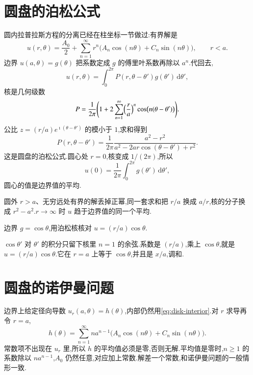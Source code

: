\section{圆盘的泊松公式}
圆内拉普拉斯方程的分离已经在柱坐标一节做过:有界解是
\begin{equation}
  u(r,\theta)=\frac{A_0}{2}+\sum_{n=1}^{\infty}r^n\bigl(A_n\cos(n\theta)+C_n\sin(n\theta)\bigr),
  \qquad r<a.
  \label{eq:disk-interior}
\end{equation}
边界 $u(a,\theta)=g(\theta)$ 把系数定成 $g$ 的傅里叶系数再除以 $a^n$.代回去,
\begin{equation}
  u(r,\theta)=\int_0^{2\pi}P(r,\theta-\theta')g(\theta')\,\mathrm{d}\theta',
\end{equation}
核是几何级数
\begin{equation}
  P=\frac{1}{2\pi}\Biggl(1+2\sum_{n=1}^{\infty}\Bigl(\frac{r}{a}\Bigr)^n\cos\bigl(n(\theta-\theta')\bigr)\Biggr).
\end{equation}
公比 $z=(r/a)e^{\imath(\theta-\theta')}$ 的模小于 $1$,求和得到
\begin{equation}
  P(r,\theta-\theta')
  =\frac{1}{2\pi}\frac{a^2-r^2}{a^2-2ar\cos(\theta-\theta')+r^2}.
  \label{eq:poisson-kernel}
\end{equation}
这是圆盘的泊松公式.圆心处 $r=0$,核变成 $1/(2\pi)$,所以
\begin{equation}
  u(0)=\frac{1}{2\pi}\int_0^{2\pi}g(\theta')\,\mathrm{d}\theta',
\end{equation}
圆心的值是边界值的平均.

圆外 $r>a$、无穷远处有界的解丢掉正幂,同一套求和把 $r/a$ 换成 $a/r$,核的分子换成 $r^2-a^2$.$r\to\infty$ 时 $u$ 趋于边界值的同一个平均.

\begin{example}
边界 $g=\cos\theta$,用泊松核核对 $u=(r/a)\cos\theta$.
\end{example}
\begin{solution}
$\cos\theta'$ 对 $\theta'$ 的积分只留下核里 $n=1$ 的余弦.系数是 $(r/a)$,乘上 $\cos\theta$,就是 $u=(r/a)\cos\theta$.它在 $r=a$ 上等于 $\cos\theta$,并且是 $x/a$,调和.
\end{solution}

\section{圆盘的诺伊曼问题}
边界上给定径向导数 $u_r(a,\theta)=h(\theta)$,内部仍然用\eqref{eq:disk-interior}.对 $r$ 求导再令 $r=a$,
\begin{equation}
  h(\theta)=\sum_{n=1}^{\infty}n a^{n-1}\bigl(A_n\cos(n\theta)+C_n\sin(n\theta)\bigr).
\end{equation}
常数项不出现在 $u_r$ 里,所以 $h$ 的平均值必须是零,否则无解.平均值是零时,$n\geq 1$ 的系数除以 $na^{n-1}$,$A_0$ 仍然任意,对应加上常数.解差一个常数,和诺伊曼问题的一般情形一致.

